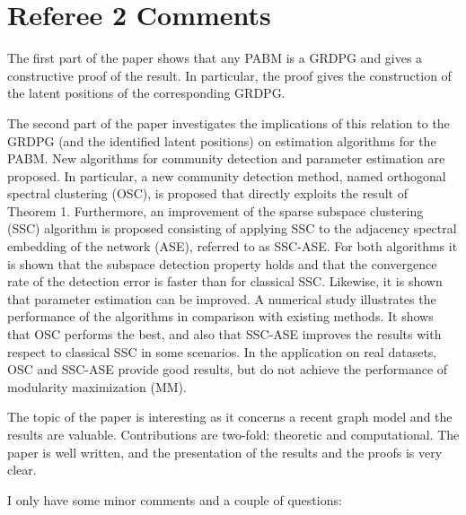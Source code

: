 \documentclass[
]{article}
\begin{document}
\hypertarget{referee-2-comments}{%
\section{Referee 2 Comments}\label{referee-2-comments}}

The first part of the paper shows that any PABM is a GRDPG and gives a
constructive proof of the result. In particular, the proof gives the
construction of the latent positions of the corresponding GRDPG.

The second part of the paper investigates the implications of this
relation to the GRDPG (and the identified latent positions) on
estimation algorithms for the PABM. New algorithms for community
detection and parameter estimation are proposed. In particular, a new
community detection method, named orthogonal spectral clustering (OSC),
is proposed that directly exploits the result of Theorem 1. Furthermore,
an improvement of the sparse subspace clustering (SSC) algorithm is
proposed consisting of applying SSC to the adjacency spectral embedding
of the network (ASE), referred to as SSC-ASE. For both algorithms it is
shown that the subspace detection property holds and that the
convergence rate of the detection error is faster than for classical
SSC. Likewise, it is shown that parameter estimation can be improved. A
numerical study illustrates the performance of the algorithms in
comparison with existing methods. It shows that OSC performs the best,
and also that SSC-ASE improves the results with respect to classical SSC
in some scenarios. In the application on real datasets, OSC and SSC-ASE
provide good results, but do not achieve the performance of modularity
maximization (MM).

The topic of the paper is interesting as it concerns a recent graph
model and the results are valuable. Contributions are two-fold:
theoretic and computational. The paper is well written, and the
presentation of the results and the proofs is very clear.

I only have some minor comments and a couple of questions:
\end{document}
